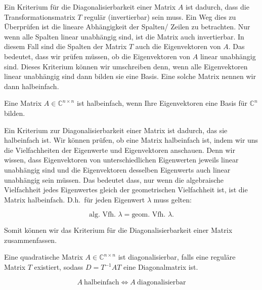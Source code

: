Ein Kriterium für die Diagonalisierbarkeit einer Matrix \( A \) ist dadurch, dass die Transformationsmatrix \( T \) regulär (invertierbar) sein muss. Ein Weg dies zu Überprüfen ist die lineare Abhängigkeit der Spalten/ Zeilen zu betrachten. Nur wenn alle Spalten linear unabhängig sind, ist die Matrix auch invertierbar. In diesem Fall sind die Spalten der Matrix \( T \) auch die Eigenvektoren von \( A \). Das bedeutet, dass wir prüfen müssen, ob die Eigenvektoren von \( A \) linear unabhängig sind. Dieses Kriterium können wir umschreiben denn, wenn alle Eigenvektoren linear unabhängig sind dann bilden sie eine Basis. Eine solche Matrix nennen wir dann halbeinfach. 

\begin{tcolorbox}[colback=gray!30, colframe=gray!80, title=Halbeinfache Matrizen]
    Eine Matrix \( A \in \mathbb{C}^{n \times n} \) ist halbeinfach, wenn Ihre Eigenvektoren eine Basis für \( \mathbb{C}^n \) bilden. 
\end{tcolorbox}

Ein Kriterium zur Diagonalisierbarkeit einer Matrix ist dadurch, das sie halbeinfach ist. Wir können prüfen, ob eine Matrix halbeinfach ist, indem wir uns die Vielfachheiten der Eigenwerte und Eigenvektoren anschauen. Denn wir wissen, dass Eigenvektoren von unterschiedlichen Eigenwerten jeweils linear unabhängig sind und die Eigenvektoren desselben Eigenwerts auch linear unabhängig sein müssen. Das bedeutet dass, nur wenn die algebraische Vielfachheit jedes Eigenwertes gleich der geometrischen Vielfachheit ist, ist die Matrix halbeinfach. D.h.\ für jeden Eigenwert \( \lambda \) muss gelten:

\begin{equation*}
    \text{alg. Vfh. } \lambda = \text{geom. Vfh. } \lambda.
\end{equation*}

Somit können wir das Kriterium für die Diagonalisierbarkeit einer Matrix zusammenfassen.

\begin{tcolorbox}[colback=gray!30, colframe=gray!80, title=Halbeinfache Matrizen]
    Eine quadratische Matrix \( A \in \mathbb{C}^{n \times n} \) ist diagonalisierbar, falls eine reguläre Matrix \( T \) existiert, sodass \( D = T^{-1} A T \) eine Diagonalmatrix ist. 

    \begin{equation*}
        A \ \text{halbeinfach} \Leftrightarrow A \ \text{diagonalisierbar}
    \end{equation*}
\end{tcolorbox}

